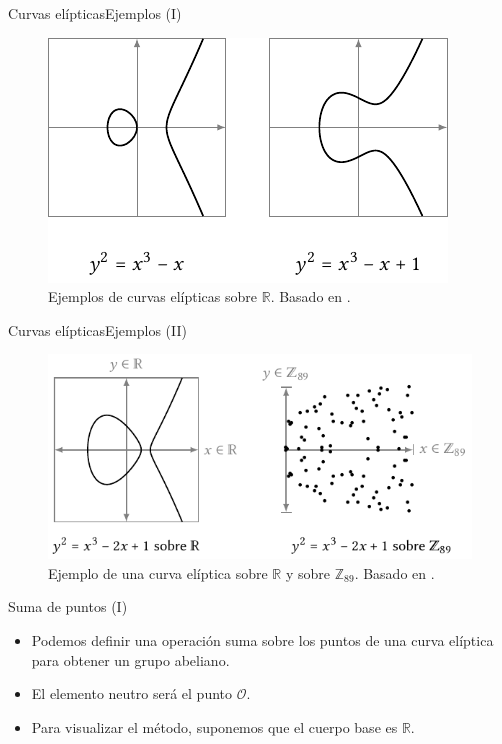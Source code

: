 \documentclass[spanish]{beamer}
\begin{document}
\begin{frame}[fragile]{Curvas elípticas}{Ejemplos (I)}
  \begin{figure}[h]
    \centering
    \includegraphics[width=.75\textwidth]{img/ejemplos-curvas}
    \caption{Ejemplos de curvas elípticas sobre $\mathbb{R}$. Basado en \parencite{eichlseder_elliptic_2016}.}
    \label{fig:curvas}
  \end{figure}
\end{frame}

\begin{frame}[fragile]{Curvas elípticas}{Ejemplos (II)}
  \begin{figure}[h]
    \centering
    \includegraphics[width=.85\textwidth]{img/cuerpos-curvas}
    \caption{Ejemplo de una curva elíptica sobre $\mathbb{R}$ y sobre $\mathbb{Z}_{89}$. Basado en \parencite{eichlseder_elliptic_2016}.}
    \label{fig:curvas-finitos}
  \end{figure}
\end{frame}

\begin{frame}{Suma de puntos (I)}
  \begin{itemize}
    \item Podemos definir una operación suma sobre los puntos de una curva elíptica para obtener un grupo abeliano.
    \item El elemento neutro será el punto \(\mathcal{O}\).
    \item Para visualizar el método, suponemos que el cuerpo base es $\mathbb{R}$.
  \end{itemize}
\end{frame}
\end{document}
